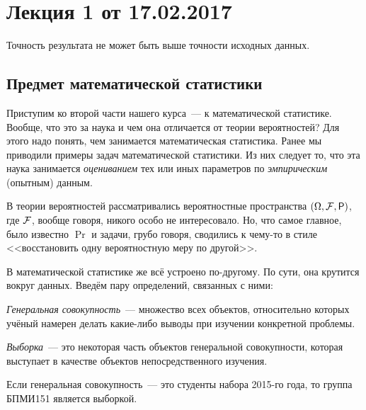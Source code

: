 \section{Лекция 1 от 17.02.2017}
\epigraph{Точность результата не может быть выше точности исходных данных.}{}
\subsection{Предмет математической статистики}
Приступим ко второй части нашего курса~--- к математической статистике. Вообще, 
что это за наука и чем она отличается от теории вероятностей? Для этого надо 
понять, чем занимается математическая статистика. Ранее мы приводили примеры 
задач математической статистики. Из них следует то, что эта наука занимается 
\emph{оцениванием} тех или иных параметров по \emph{эмпирическим} (опытным) 
данным.

В теории вероятностей рассматривались вероятностные пространства \((\Omega, \F, 
\Pr)\), где \(\mathcal{F}\), вообще говоря, никого особо не интересовало. Но, что самое 
главное, было известно \(\Pr\) и задачи, грубо говоря, сводились к чему-то в 
стиле <<восстановить одну вероятностную меру по другой>>. 

В математической статистике же всё устроено по-другому. По сути, она крутится 
вокруг данных. Введём пару определений, связанных с ними:
\begin{definition}
	\emph{Генеральная совокупность}~--- множество всех объектов, 
	относительно которых учёный намерен делать какие-либо выводы при изучении 
	конкретной проблемы.
\end{definition}
\begin{definition}
	\emph{Выборка}~--- это некоторая часть объектов генеральной совокупности, 
	которая выступает в качестве объектов непосредственного изучения.
\end{definition}
\begin{example}
	Если генеральная совокупность~--- это студенты набора 2015-го года, то 
	группа БПМИ151 является выборкой.
\end{example}


